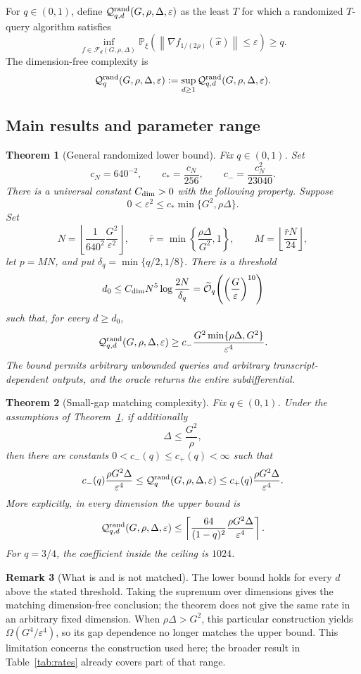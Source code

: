 \documentclass[11pt,a4paper]{article}
\newcommand{\Prob}{\mathbb{P}}
\newcommand{\eps}{\varepsilon}
\newcommand{\norm}[1]{\left\lVert #1\right\rVert}
\newcommand{\tO}{\widetilde{\mathcal O}}
\newcommand{\cF}{\mathcal F}
\newcommand{\cQ}{\mathcal Q}
\newtheorem{theorem}{Theorem}[section]
\theoremstyle{definition}
\newtheorem{remark}[theorem]{Remark}
\numberwithin{equation}{section}
\begin{document}
For $q\in(0,1)$, define $\cQ^{\rm rand}_{q,d}(G,\rho,\Delta,\eps)$ as the least $T$ for which a randomized $T$-query algorithm satisfies
\[
 \inf_{f\in\cF_d(G,\rho,\Delta)}
 \Prob_\xi\!\left(
   \norm{\nabla f_{1/(2\rho)}(\widehat x)}\le\eps
 \right)\ge q.
\]
The dimension-free complexity is
\[
 \cQ^{\rm rand}_q(G,\rho,\Delta,\eps)
 :=\sup_{d\ge1}\cQ^{\rm rand}_{q,d}(G,\rho,\Delta,\eps).
\]

\subsection{Main results and parameter range}

\begin{theorem}[General randomized lower bound]\label{thm:general-lower}
Fix $q\in(0,1)$. Set
\[
 c_N=640^{-2},\qquad c_*=\frac{c_N}{256},\qquad
 c_-=\frac{c_N^2}{23040}.
\]
There is a universal constant $C_{\rm dim}>0$ with the following property. Suppose
\[
 0<\eps^2\le c_*\min\{G^2,\rho\Delta\}.
\]
Set
\[
 N=\left\lfloor \frac{1}{640^2}\frac{G^2}{\eps^2}\right\rfloor,
 \qquad
 \bar r=\min\left\{\frac{\rho\Delta}{G^2},1\right\},
 \qquad
 M=\left\lfloor\frac{\bar rN}{24}\right\rfloor,
\]
let $p=MN$, and put $\delta_q=\min\{q/2,1/8\}$.  There is a threshold
\[
 d_0\le C_{\rm dim}N^5\log\frac{2N}{\delta_q}
 =\tO_q\!\left(\left(\frac G\eps\right)^{10}\right)
\]
such that, for every $d\ge d_0$,
\[
 \cQ^{\rm rand}_{q,d}(G,\rho,\Delta,\eps)
 \ge c_-\frac{G^2\min\{\rho\Delta,G^2\}}{\eps^4}.
\]
The bound permits arbitrary unbounded queries and arbitrary transcript-dependent outputs, and the oracle returns the entire subdifferential.
\end{theorem}

\begin{theorem}[Small-gap matching complexity]\label{thm:matching}
Fix $q\in(0,1)$.  Under the assumptions of Theorem~\ref{thm:general-lower}, if additionally
\[
 \Delta\le\frac{G^2}{\rho},
\]
then there are constants $0<c_-(q)\le c_+(q)<\infty$ such that
\[
 c_-(q)\frac{\rho G^2\Delta}{\eps^4}
 \le
 \cQ^{\rm rand}_q(G,\rho,\Delta,\eps)
 \le
 c_+(q)\frac{\rho G^2\Delta}{\eps^4}.
\]
More explicitly, in every dimension the upper bound is
\[
 \cQ^{\rm rand}_{q,d}(G,\rho,\Delta,\eps)
 \le\left\lceil\frac{64}{(1-q)^2}
               \frac{\rho G^2\Delta}{\eps^4}\right\rceil.
\]
For $q=3/4$, the coefficient inside the ceiling is $1024$.
\end{theorem}


\begin{remark}[What is and is not matched]\label{rem:scope}
The lower bound holds for every $d$ above the stated threshold. Taking the
supremum over dimensions gives the matching dimension-free conclusion;
the theorem does not give the same rate in an arbitrary fixed dimension.
When $\rho\Delta>G^2$, this particular construction yields
$\Omega(G^4/\eps^4)$, so its gap dependence no longer matches the upper
bound. This limitation concerns the construction used here; the broader
result in Table~\ref{tab:rates} already covers part of that range.
\end{remark}
\end{document}
